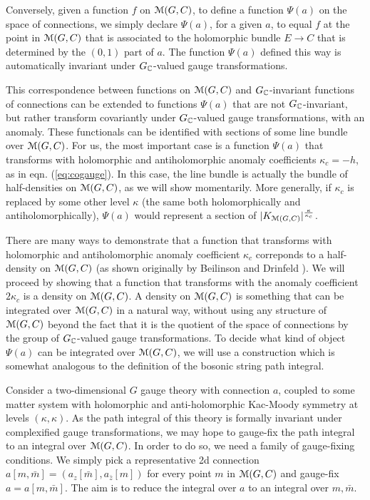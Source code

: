 \documentclass[11pt,a4paper]{article}
\begin{document}
Conversely, given a function $f$ on ${\mathcal M}(G,C)$, to define a  function $\Psi(a)$ on the space of connections, we simply declare $\Psi(a)$, for a given $a$,
to equal $f$ at the point in ${\mathcal M}(G,C)$ that is associated to the holomorphic bundle $E\to C$ that is determined by the $(0,1)$ part of $a$.   The function $\Psi(a)$
defined this way is automatically invariant under $G_{\mathbb C}$-valued gauge transformations.  

This correspondence between functions on ${\mathcal M}(G,C)$ and $G_{\mathbb C}$-invariant functions of connections can be extended
to functions $\Psi(a)$ that are not $G_{\mathbb C}$-invariant, but rather transform covariantly under $G_{\mathbb C}$-valued gauge transformations, with an anomaly.
These functionals can be identified with sections of some line bundle over ${\mathcal M}(G,C)$.
For us, the most important case is a function $\Psi(a)$ that transforms  with holomorphic and antiholomorphic anomaly coefficients $\kappa_c=-h$,
as in 
eqn. (\ref{eq:cogauge}). 
In this case, the line bundle  is actually the bundle of half-densities on ${\mathcal M}(G,C)$, as we will show momentarily.
More generally, if $\kappa_c$ is replaced by some other level $\kappa$ (the same both holomorphically and antiholomorphically),
$\Psi(a)$  would represent a section of $|K_{{\mathcal M}(G,C)}|^{\frac{\kappa}{\kappa_c}}$. 

There are many ways to demonstrate that a function that transforms with holomorphic and antiholomorphic
 anomaly coefficient $\kappa_c$  correponds to a half-density on ${\mathcal M}(G,C)$ (as shown originally by Beilinson and Drinfeld \cite{BD}).
We will proceed by showing that a function that transforms with the anomaly coefficient $2\kappa_c$ is a density on ${\mathcal M}(G,C)$.   A density
on ${\mathcal M}(G,C)$ is something that can be integrated over ${\mathcal M}(G,C)$ in a natural way, without using any structure of ${\mathcal M}(G,C)$ beyond the fact
that it is the quotient of the space of connections by the group of $G_{\mathbb C}$-valued gauge transformations.
To decide what kind of object $\Psi(a)$ can be integrated over ${\mathcal M}(G,C)$, we will use
a construction which is somewhat analogous to the definition of the bosonic string path integral. 

Consider a two-dimensional $G$ gauge theory with  connection $a$, coupled to some matter system with holomorphic and anti-holomorphic Kac-Moody symmetry at levels $(\kappa, \kappa)$. As the path integral of this theory is formally invariant under 
complexified gauge transformations, we may hope to gauge-fix the path integral to an integral over ${\mathcal M}(G,C)$. In order to do so, we need a family of  gauge-fixing conditions. We simply pick a representative 2d connection $a[m, \bar m] = (a_z[\bar m], a_{\bar z}[m])$ for every point $m$ in ${\mathcal M}(G,C)$ and gauge-fix $a = a[m, \bar m]$.
The aim is to reduce the integral over $a$ to an integral over $m,\bar m$.
\end{document}
